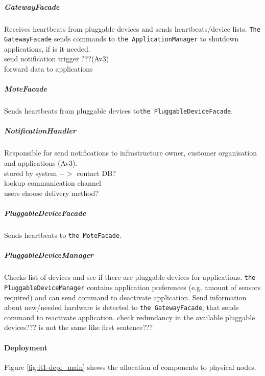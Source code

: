     \subparagraph{GatewayFacade}
        Receives heartbeats from pluggable devices and sends heartbeats/device lists.
        \texttt{The GatewayFacade} sends commands to \texttt{the ApplicationManager}
        to shutdown applications, if is it needed. \\

        send notification trigger ???(Av3)\\
        forward data to applications

    \subparagraph{MoteFacade}
        Sends heartbeats from pluggable devices to\texttt{the PluggableDeviceFacade}.

    \subparagraph{NotificationHandler}
        Responsible for send notifications to infrastructure owner, customer organisation
        and applications (Av3). \\
        stored by system \(->\) contact DB? \\
        lookup communication channel \\
        users choose delivery method?

    \subparagraph{PluggableDeviceFacade}
        Sends heartbeats to \texttt{the MoteFacade}.

    \subparagraph{PluggableDeviceManager}
        Checks list of devices and see if there are pluggable devices for applications.
        \texttt{the PluggableDeviceManager} contains application preferences (e.g. amount of sensors required) and
        can send command to deactivate application.
        Send information about new/needed hardware is detected to \texttt{the GatewayFacade}, that sends command to
        reactivate application.
        check redundancy in the available pluggable devices??? is not the same like first sentence???


    \paragraph{Deployment}
        Figure \ref{fig:it1-depl_main} shows the allocation of components
        to physical nodes.

